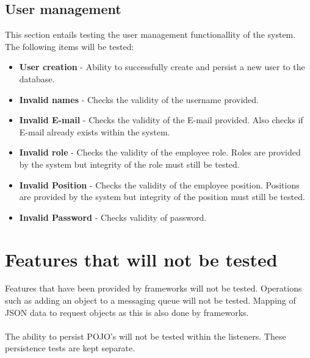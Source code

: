 \documentclass[11pt,a4paper]{article}
\begin{document}
\subsection{User management}
This section entails testing the user management functionallity of the system. The following items will be tested:
\begin{itemize}
	\item \textbf{User creation} - Ability to successfully create and persist a new user to the database.
	\item \textbf{Invalid names} - Checks the validity of the username provided.
	\item \textbf{Invalid E-mail} - Checks the validity of the E-mail provided. Also checks if E-mail already exists within the system.
	\item \textbf{Invalid role} - Checks the validity of the employee role. Roles are provided by the system but integrity of the role must still be tested.
	\item \textbf{Invalid Position} - Checks the validity of the employee position. Positions are provided by the system but integrity of the position must still be tested.
	\item \textbf{Invalid Password} - Checks validity of password.
\end{itemize}

\section{Features that will not be tested}

Features that have been provided by frameworks will not be tested. Operations such as adding an object to a messaging queue will not be tested. Mapping of JSON data to request objects as this is also done by frameworks. \\ \\
The ability to persist POJO's will not be tested within the listeners. These persistence tests are kept separate.
\end{document}
